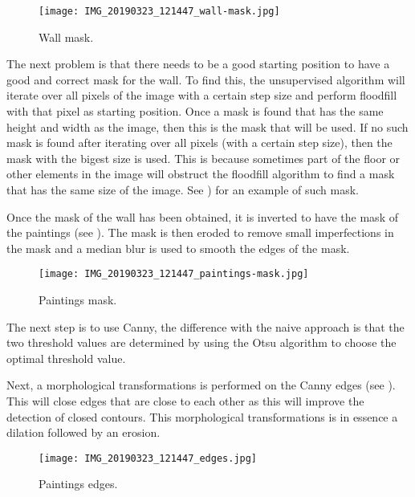 \begin{figure}[h]
    \texttt{[image: IMG\_20190323\_121447\_wall-mask.jpg]}
    \caption{Wall mask.}
    \label{fig:paiting_detection_wall-mask}
\end{figure}

The next problem is that there needs to be a good starting position to have a good and correct mask for the wall. To find this, the unsupervised algorithm will iterate over all pixels of the image with a certain step size and perform floodfill with that pixel as starting position. Once a mask is found that has the same height and width as the image, then this is the mask that will be used. If no such mask is found after iterating over all pixels (with a certain step size), then the mask with the bigest size is used. This is because sometimes part of the floor or other elements in the image will obstruct the floodfill algorithm to find a mask that has the same size of the image. See ) for an example of such mask.

Once the mask of the wall has been obtained, it is inverted to have the mask of the paintings (see ). The mask is then eroded to remove small imperfections in the mask and a median blur is used to smooth the edges of the mask.

\begin{figure}[h]
    \texttt{[image: IMG\_20190323\_121447\_paintings-mask.jpg]}
    \caption{Paintings mask.}
    \label{fig:paiting_detection_paintings-mask}
\end{figure}

The next step is to use Canny, the difference with the naive approach is that the two threshold values are determined by using the Otsu algorithm to choose the optimal threshold value.

Next, a morphological transformations is performed on the Canny edges (see ). This will close edges that are close to each other as this will improve the detection of closed contours. This morphological transformations is in essence a dilation followed by an erosion.

\begin{figure}[h]
    \texttt{[image: IMG\_20190323\_121447\_edges.jpg]}
    \caption{Paintings edges.}
    \label{fig:paiting_detection_paintings-edges}
\end{figure}

